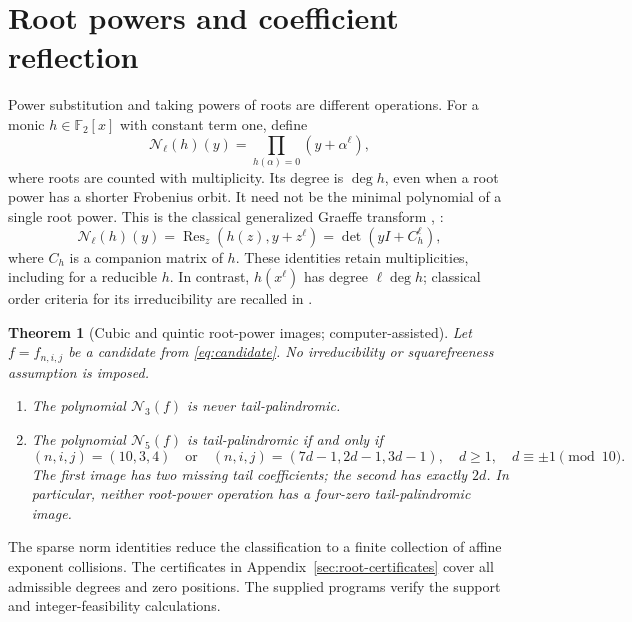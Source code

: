 \documentclass[11pt]{article}
\newtheorem{theorem}[proposition]{Theorem}
\theoremstyle{definition}
\theoremstyle{remark}
\begin{document}
\section{Root powers and coefficient reflection}\label{sec:root-powers}
Power substitution and taking powers of roots are different operations.
For a monic $h\in\mathbb F_2[x]$ with constant term one, define
\begin{equation}\label{eq:root-power-definition}
 \mathcal N_\ell(h)(y)=\prod_{h(\alpha)=0}(y+\alpha^\ell),
\end{equation}
where roots are counted with multiplicity. Its degree is $\deg h$,
even when a root power has a shorter Frobenius orbit. It need not be
the minimal polynomial of a single root power.
This is the classical generalized Graeffe transform
\cite[Section 5]{BFSS06}, \cite[Section 3.1]{GHL15}:
\[
 \mathcal N_\ell(h)(y)
   =\operatorname{Res}_z(h(z),y+z^\ell)
   =\det(yI+C_h^\ell),
\]
where $C_h$ is a companion matrix of $h$.
These identities retain multiplicities, including for a reducible $h$.
In contrast,
$h(x^\ell)$ has degree $\ell\deg h$; classical order criteria for its
irreducibility are recalled in \cite[Section 2]{BM25}.

\begin{theorem}[Cubic and quintic root-power images; computer-assisted]
\label{thm:root-powers}
Let $f=f_{n,i,j}$ be a candidate from \eqref{eq:candidate}.
No irreducibility or squarefreeness assumption is imposed.
\begin{enumerate}
\item The polynomial $\mathcal N_3(f)$ is never tail-palindromic.
\item The polynomial $\mathcal N_5(f)$ is tail-palindromic if and only if
\begin{equation}\label{eq:quintic-parameters}
 (n,i,j)=(10,3,4)
 \quad\text{or}\quad
 (n,i,j)=(7d-1,2d-1,3d-1),
 \quad d\ge1,\quad d\equiv\pm1\pmod {10}.
\end{equation}
The first image has two missing tail coefficients; the second has
exactly $2d$. In particular, neither root-power operation has a
four-zero tail-palindromic image.
\end{enumerate}
\end{theorem}

The sparse norm identities reduce the classification to a finite
collection of affine exponent collisions. The certificates in
Appendix~\ref{sec:root-certificates} cover all admissible degrees
and zero positions. The supplied programs verify the support and
integer-feasibility calculations.
\end{document}
